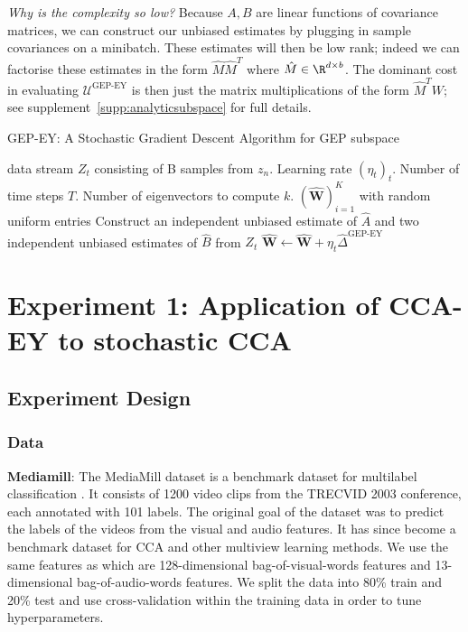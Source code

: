 \textit{Why is the complexity so low?} Because $A,B$ are linear functions of covariance matrices, we can construct our unbiased estimates by plugging in sample covariances on a minibatch.
These estimates will then be low rank; indeed we can factorise these estimates in the form $\hat{M} \hat{M}^T$ where $\hat{M} \in \R^{d \times b}$. The dominant cost in evaluating $\mathcal{U}^\text{GEP-EY}$ is then just the matrix multiplications of the form $\hat{M}^T W$; see supplement~\ref{supp:analyticsubspace} for full details.

\begin{algorithm}
    \caption{GEP-EY: A Stochastic Gradient Descent Algorithm for GEP subspace}
    \label{alg:Delta}
    \begin{algorithmic}
         data stream $Z_t$ consisting of B samples from $z_n$. Learning rate $(\eta_t)_t$. Number of time steps $T$. Number of eigenvectors to compute $k$.
         $(\hat{\mathbf {W}})_{i=1}^K$ with random uniform entries
        \STATE Construct an independent unbiased estimate of $\hat{A}$ and two independent unbiased estimates of $\hat{B}$ from $Z_t$
        \STATE $\hat{\mathbf {W}} \leftarrow \hat{\mathbf {W}}+\eta_{t} \hat{\Delta}^{\text{GEP-EY}}$
        \ENDFOR
    \end{algorithmic}
\end{algorithm}

\section{Experiment 1: Application of CCA-EY to stochastic CCA}

\subsection{Experiment Design}

\subsubsection{Data}
\textbf{Mediamill}: The MediaMill dataset \citep{feng2004context} is a benchmark dataset for multilabel classification
. It consists
of 1200 video clips from the TRECVID 2003 conference, each annotated with 101 labels. The original goal of the dataset was to predict the labels of the videos from the visual and audio features. It has since become a benchmark dataset for CCA and other multiview learning methods. We use the same features as \citep{gemp2022generalized} which are 128-dimensional bag-of-visual-words features and 13-dimensional bag-of-audio-words features. We split the data into 80\% train and 20\% test and use cross-validation within the training data in order to tune hyperparameters.

